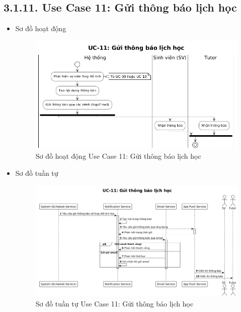 \subsection*{3.1.11. Use Case 11: Gửi thông báo lịch học}
\begin{itemize}
    \item Sơ đồ hoạt động
    \begin{figure}[H]
    \centering
    \includegraphics[scale=0.5 ]{Picture/ACUC11.png}
    \caption{Sơ đồ hoạt động Use Case 11: Gửi thông báo lịch học}
    \end{figure}
    \item Sơ đồ tuần tự
    \begin{figure}[H]
    \centering
    \includegraphics[scale=0.4 ]{Picture/SEUC11.png}
    \caption{Sơ đồ tuần tự Use Case 11: Gửi thông báo lịch học}
    \end{figure}
\end{itemize}
